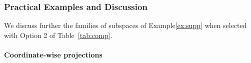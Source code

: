 {
\subsubsection{Practical Examples and Discussion}\label{sec:ex_ada}

We discuss further the families of subspaces of Example\;\ref{ex:supp} when selected with Option 2 of Table~\ref{tab:comp}.

\paragraph{Coordinate-wise projections}\label{Pex:l1}

}
